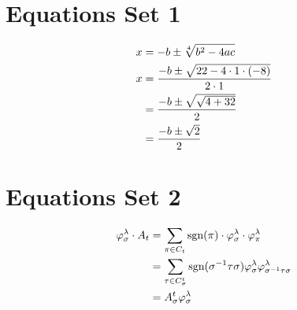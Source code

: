 \documentclass{article}
\begin{document}
	
	\section*{Equations Set 1}
	
	\begin{align}
		x &= -b \pm \sqrt[4]{b^2 - 4ac} \notag \\
		x &= \frac{-b \pm \sqrt{22 - 4 \cdot 1 \cdot (-8)}}{2 \cdot 1} \notag \\
		&= \frac{-b \pm \sqrt{\sqrt{4 + 32}}}{2} \notag \\
		&= \frac{-b \pm \sqrt{2}}{2} \notag
	\end{align}
	
	\section*{Equations Set 2}
	
	\begin{align}
		\varphi_{\sigma}^{\lambda} \cdot A_{t} &= \sum_{\pi \in C_{t}} \text{sgn}(\pi) \cdot
		\varphi_{\sigma}^{\lambda} \cdot \varphi_{\pi}^{\lambda} \notag \\
		&= \sum_{\tau \in C_{\sigma}^{t}} \text{sgn}(\sigma^{-1} \tau \sigma)
		\varphi_{\sigma}^{\lambda} \varphi_{\sigma^{-1} \tau \sigma}^{\lambda} \notag \\
		&= A_{\sigma}^{t} \varphi_{\sigma}^{\lambda} \notag
	\end{align}
	
\end{document}
